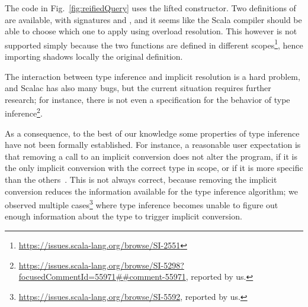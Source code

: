 The code in Fig.~\ref{fig:reifiedQuery} uses the lifted  constructor. Two definitions of  are available, with signatures  and , and it seems like the Scala compiler should be able to choose which one to apply using overload resolution. This however is not supported simply because the two functions are defined in different scopes\footnote{\url{https://issues.scala-lang.org/browse/SI-2551}}, hence importing  shadows locally the original definition.



The interaction between type inference and implicit resolution is a hard problem, and Scalac has also many bugs, but the current situation requires further research; for instance, there is not even a specification for the behavior of type inference\footnote{\url{https://issues.scala-lang.org/browse/SI-5298?focusedCommentId=55971##comment-55971}, reported by us.}.

As a consequence, to the best of our knowledge some properties of type inference have not been formally established.
For instance, a reasonable user expectation is that removing a call to an implicit conversion does not alter the program, if it is the only implicit conversion with the correct type in scope, or if it is more specific than the others~\citep[Ch. 21]{Odersky11book}. This is not always correct, because removing the implicit conversion reduces the information available for the type inference algorithm; we observed multiple cases\footnote{\url{https://issues.scala-lang.org/browse/SI-5592}, reported by us.} where type inference becomes unable to figure out enough information about the type to trigger implicit conversion.

